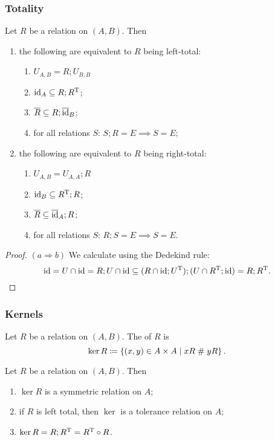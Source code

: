 \subsubsection{Totality}
\begin{lemma} \label{totalityEquivalences}
Let $R$ be a relation on $(A, B)$. Then
\begin{enumerate}
\item the following are equivalent to $R$ being left-total:
\begin{enumerate}
\item $U_{A,B} = R;U_{B,B}$
\item $\operatorname{id}_A \subseteq R;R^{\mathrm{T}}$;
\item $\overline{R}\subseteq R;\overline{\operatorname{id}}_B$;
\item for all relations $S$: $S;R = E \implies S = E$;
\end{enumerate}
\item the following are equivalent to $R$ being right-total:
\begin{enumerate}
\item $U_{A,B} = U_{A,A};R$
\item $\operatorname{id}_B \subseteq R^{\mathrm{T}};R$;
\item $\overline{R}\subseteq \overline{\operatorname{id}}_A;R$;
\item for all relations $S$: $R;S = E \implies S = E$.
\end{enumerate}
\end{enumerate}
\end{lemma}
\begin{proof}
$(a \Rightarrow b)$ We calculate using the Dedekind rule:
\[ \operatorname{id} = U\cap \operatorname{id} = R;U\cap \operatorname{id} \subseteq (R\cap \operatorname{id};U^{\mathrm{T}});(U\cap R^{\mathrm{T}};\operatorname{id}) = R;R^{\mathrm{T}}. \]
\end{proof}

\subsubsection{Kernels}

\begin{definition}
Let $R$ be a relation on $(A, B)$. The  of $R$ is
\[ \ker R \coloneqq \left\{ (x,y)\in A\times A \;\middle|\; xR \mathrel{\#} yR \right\}. \]
\end{definition}

\begin{lemma}
Let $R$ be a relation on $(A, B)$. Then
\begin{enumerate}
\item $\ker R$ is a symmetric relation on $A$;
\item if $R$ is left total, then $\ker$ is a tolerance relation on $A$;
\item $\ker R = R;R^{\mathrm{T}} = R^{\mathrm{T}}\circ R$.
\end{enumerate}
\end{lemma}


